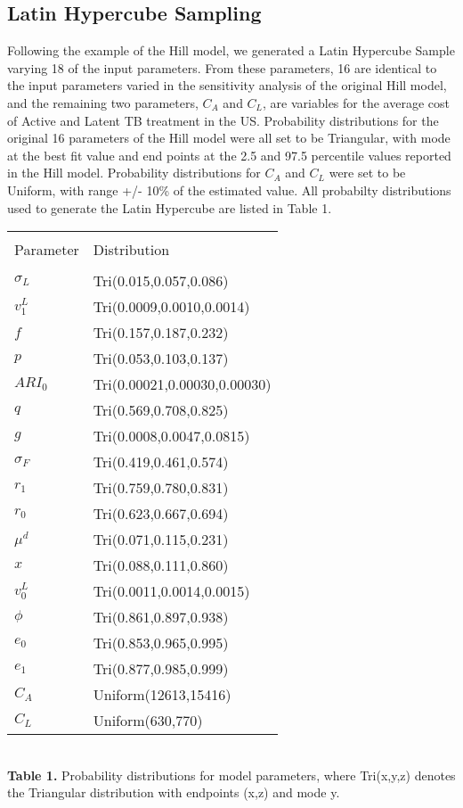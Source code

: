 \documentclass{article}[11pt]
\begin{document}
\subsection{Latin Hypercube Sampling}
Following the example of the Hill model, we generated a Latin Hypercube Sample varying 18 of the input parameters.  From these parameters, 16 are identical to the input parameters varied in the sensitivity analysis of the original Hill model, and the remaining two parameters, $C_{A}$ and $C_{L}$, are variables for the average cost of Active and Latent TB treatment in the US.   Probability distributions for the original 16 parameters of the Hill model were all set to be Triangular, with mode at the best fit value and end points at the 2.5 and 97.5 percentile values reported in the Hill model.  Probability distributions for $C_{A}$ and $C_{L}$ were set to be Uniform, with range +/- 10\% of the estimated value.  All probabilty distributions used to generate the Latin Hypercube are listed in Table 1.\\

\begin{table}[h]
\centering
\begin{tabular}{l l}
\hline\hline\\
Parameter & Distribution\\ [0.5ex]
\hline\\
$\sigma_{L}$  & Tri(0.015,0.057,0.086) \\
$v^{L}_{1}$   & Tri(0.0009,0.0010,0.0014) \\
$f$                 & Tri(0.157,0.187,0.232) \\
$p$                & Tri(0.053,0.103,0.137) \\
$ARI_{0}$      & Tri(0.00021,0.00030,0.00030) \\
$q$                & Tri(0.569,0.708,0.825) \\
$g$                & Tri(0.0008,0.0047,0.0815)  \\
$\sigma_{F}$ & Tri(0.419,0.461,0.574) \\
$r_{1}$          & Tri(0.759,0.780,0.831) \\
$r_{0}$          & Tri(0.623,0.667,0.694) \\
$\mu^{d}$      & Tri(0.071,0.115,0.231) \\
$x$                 & Tri(0.088,0.111,0.860) \\
$v^{L}_{0}$   & Tri(0.0011,0.0014,0.0015) \\
$\phi$            & Tri(0.861,0.897,0.938) \\
$e_{0}$          & Tri(0.853,0.965,0.995) \\
$e_{1}$          & Tri(0.877,0.985,0.999) \\
$C_{A}$           & Uniform(12613,15416) \\
$C_{L}$           & Uniform(630,770) \\ [1ex]
\hline
\end{tabular}\\[1ex]

{\bf Table 1.} Probability distributions for model parameters, where Tri(x,y,z) denotes the 
Triangular distribution with endpoints (x,z) and mode y.
\end{table}
\end{document}
